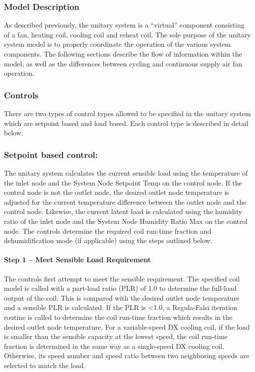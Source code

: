 \subsubsection{Model Description}\label{model-description}

As described previously, the unitary system is a ``virtual'' component consisting of a fan, heating coil, cooling coil and reheat coil. The sole purpose of the unitary system model is to properly coordinate the operation of the various system components. The following sections describe the flow of information within the model, as well as the differences between cycling and continuous supply air fan operation.

\subsubsection{Controls}\label{controls}

There are two types of control types allowed to be specified in the unitary system which are setpoint based and load based. Each control type is described in detail below.

\subsubsection{Setpoint based control:}\label{setpoint-based-control}

The unitary system calculates the current sensible load using the temperature of the inlet node and the System Node Setpoint Temp on the control node. If the control node is not the outlet node, the desired outlet node temperature is adjusted for the current temperature difference between the outlet node and the control node. Likewise, the current latent load is calculated using the humidity ratio of the inlet node and the System Node Humidity Ratio Max on the control node. The controls determine the required coil run-time fraction and dehumidification mode (if applicable) using the steps outlined below.

\paragraph{Step 1 -- Meet Sensible Load Requirement}\label{step-1-meet-sensible-load-requirement}

The controls first attempt to meet the sensible requirement. The specified coil model is called with a part-load ratio (PLR) of 1.0 to determine the full-load output of the coil. This is compared with the desired outlet node temperature and a sensible PLR is calculated. If the PLR is \textless{}1.0, a Regula-Falsi iteration routine is called to determine the coil run-time fraction which results in the desired outlet node temperature. For a variable-speed DX cooling coil, if the load is smaller than the sensible capacity at the lowest speed, the coil run-time fraction is determined in the same way as a single-speed DX cooling coil. Otherwise, its speed number and speed ratio between two neighboring speeds are selected to match the load.

